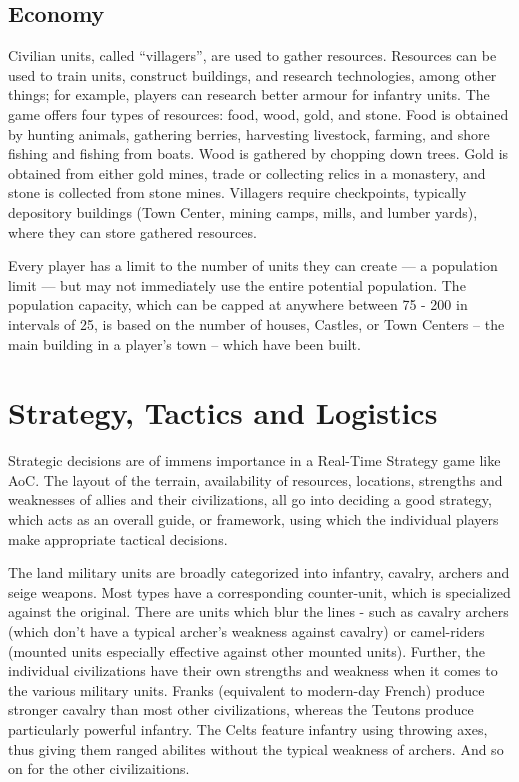 \documentclass[a4paper,12pt]{article}
\begin{document}
\subsection*{Economy}
Civilian units, called ``villagers'', are used to gather resources. Resources can be used to train units, 
construct buildings, and research technologies, among other things; for example, players can research 
better armour for infantry units. The game offers four types of resources: food, wood, gold, and stone. 
Food is obtained by hunting animals, gathering berries, harvesting livestock, farming, and shore fishing 
and fishing from boats. Wood is gathered by chopping down trees. Gold is obtained from either gold 
mines, trade or collecting relics in a monastery, and stone is collected from stone mines. Villagers 
require checkpoints, typically depository buildings (Town Center, mining camps, mills, and lumber yards), 
where they can store gathered resources.

Every player has a limit to the number of units they can create — a population limit — but may not 
immediately use the entire potential population. The population capacity, which can be capped at 
anywhere between 75 - 200 in intervals of 25, is based on the number of houses, Castles, or Town Centers
-- the main building in a player's town -- which have been built.

\section*{Strategy, Tactics and Logistics}
Strategic decisions are of immens importance in a Real-Time Strategy game like AoC. The layout of the
terrain, availability of resources, locations, strengths and weaknesses of allies and their civilizations,
all go into deciding a good strategy, which acts as an overall guide, or framework,  using which the 
individual players make appropriate tactical decisions.

The land military units are broadly categorized into infantry, cavalry, archers and seige weapons.
Most types have a corresponding counter-unit, which is specialized against the original. There are
units which blur the lines - such as cavalry archers (which don't have a typical archer's weakness 
against cavalry) or camel-riders (mounted units especially effective against other mounted units).
Further, the individual civilizations have their own strengths and weakness when it comes to the
various military units. Franks (equivalent to modern-day French) produce stronger cavalry than most other
civilizations, whereas the Teutons produce particularly powerful infantry. The Celts feature infantry 
using throwing axes, thus giving them ranged abilites without the typical weakness of archers. And so
on for the other civilizaitions.
\end{document}
